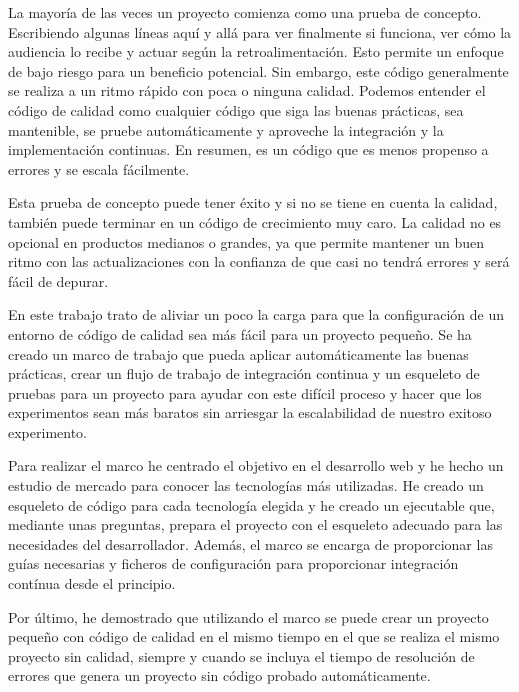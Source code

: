 La mayoría de las veces un proyecto comienza como una prueba de concepto. Escribiendo algunas líneas aquí y allá para ver finalmente si funciona, ver cómo la audiencia lo recibe y actuar según la retroalimentación. Esto permite un enfoque de bajo riesgo para un beneficio potencial. Sin embargo, este código generalmente se realiza a un ritmo rápido con poca o ninguna calidad. Podemos entender el código de calidad como cualquier código que siga las buenas prácticas, sea mantenible, se pruebe automáticamente y aproveche la integración y la implementación continuas. En resumen, es un código que es menos propenso a errores y se escala fácilmente.

Esta prueba de concepto puede tener éxito y si no se tiene en cuenta la calidad, también puede terminar en un código de crecimiento muy caro. La calidad no es opcional en productos medianos o grandes, ya que permite mantener un buen ritmo con las actualizaciones con la confianza de que casi no tendrá errores y será fácil de depurar.

En este trabajo trato de aliviar un poco la carga para que la configuración de un entorno de código de calidad sea más fácil para un proyecto pequeño. Se ha creado un marco de trabajo que pueda aplicar automáticamente las buenas prácticas, crear un flujo de trabajo de integración continua y un esqueleto de pruebas para un proyecto para ayudar con este difícil proceso y hacer que los experimentos sean más baratos sin arriesgar la escalabilidad de nuestro exitoso experimento.

Para realizar el marco he centrado el objetivo en el desarrollo web y he hecho un estudio de mercado para conocer las tecnologías más utilizadas. He creado un esqueleto de código para cada tecnología elegida y he creado un ejecutable que, mediante unas preguntas, prepara el proyecto con el esqueleto adecuado para las necesidades del desarrollador. Además, el marco se encarga de proporcionar las guías necesarias y ficheros de configuración para proporcionar integración contínua desde el principio.

Por último, he demostrado que utilizando el marco se puede crear un proyecto pequeño con código de calidad en el mismo tiempo en el que se realiza el mismo proyecto sin calidad, siempre y cuando se incluya el tiempo de resolución de errores que genera un proyecto sin código probado automáticamente.
